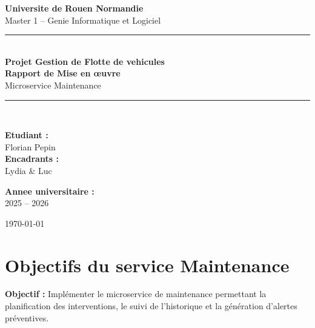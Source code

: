 \documentclass[12pt,a4paper]{article}
\begin{document}
\begin{titlepage}
  \centering
  \vspace*{1cm}

  {\Large\textbf{Universite de Rouen Normandie}\\[0.3cm]
  \large Master 1 -- Genie Informatique et Logiciel}

  \vspace{1.5cm}
  \rule{\linewidth}{0.5mm}\\[0.4cm]

  {\Huge\bfseries\color{primary} Projet Gestion de Flotte de vehicules\\[0.3cm]}
  {\LARGE\bfseries Rapport de Mise en \oe{}uvre}\\[0.3cm]
  {\large\color{darkgray} Microservice Maintenance}

  \rule{\linewidth}{0.5mm}\\[1.5cm]

  \begin{minipage}{0.45\textwidth}
    \begin{flushleft}
      \textbf{Etudiant :}\\
      Florian Pepin \\[0.5cm]
      \textbf{Encadrants :}\\
      Lydia \& Luc
    \end{flushleft}
  \end{minipage}
  \hfill
  \begin{minipage}{0.45\textwidth}
    \begin{flushright}
      \textbf{Annee universitaire :}\\
      2025 -- 2026
    \end{flushright}
  \end{minipage}

  \vfill
  {\large\today}
\end{titlepage}

\tableofcontents
\newpage

\section{Objectifs du service Maintenance}

\begin{infobox}
\textbf{Objectif :} Implémenter le microservice de maintenance permettant la planification des interventions, le suivi de l'historique et la génération d'alertes préventives.
\end{infobox}
\end{document}
